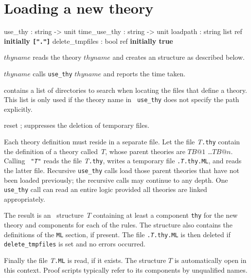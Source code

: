 \section{Loading a new theory}\label{LoadingTheories}
\begin{ttbox}
use_thy         : string -> unit
time_use_thy    : string -> unit
loadpath        : string list ref \hfill{\bf initially {\tt["."]}}
delete_tmpfiles : bool ref \hfill{\bf initially true}
\end{ttbox}

\begin{ttdescription}
\item[\ttindexbold{use_thy} $thyname$]
  reads the theory $thyname$ and creates an \ML{} structure as described below.

\item[\ttindexbold{time_use_thy} $thyname$]
  calls {\tt use_thy} $thyname$ and reports the time taken.

\item[\ttindexbold{loadpath}]
  contains a list of directories to search when locating the files that
  define a theory.  This list is only used if the theory name in {\tt
    use_thy} does not specify the path explicitly.

\item[reset \ttindexbold{delete_tmpfiles};]
suppresses the deletion of temporary files.
\end{ttdescription}
%
Each theory definition must reside in a separate file.  Let the file
{\it T}{\tt.thy} contain the definition of a theory called~$T$, whose
parent theories are $TB@1$ \dots $TB@n$.  Calling
~{\tt"{\it T\/}"} reads the file {\it T}{\tt.thy},
writes a temporary \ML{} file {\tt.{\it T}.thy.ML}, and reads the
latter file.  Recursive {\tt use_thy} calls load those parent theories
that have not been loaded previously; the recursive calls may continue
to any depth.  One {\tt use_thy} call can read an entire logic
provided all theories are linked appropriately.

The result is an \ML\ structure~$T$ containing at least a component
{\tt thy} for the new theory and components for each of the rules.
The structure also contains the definitions of the {\tt ML} section,
if present.  The file {\tt.{\it T}.thy.ML} is then deleted if {\tt
  delete_tmpfiles} is set and no errors occurred.

Finally the file {\it T}{\tt.ML} is read, if it exists.  The structure
$T$ is automatically open in this context.  Proof scripts typically
refer to its components by unqualified names.

